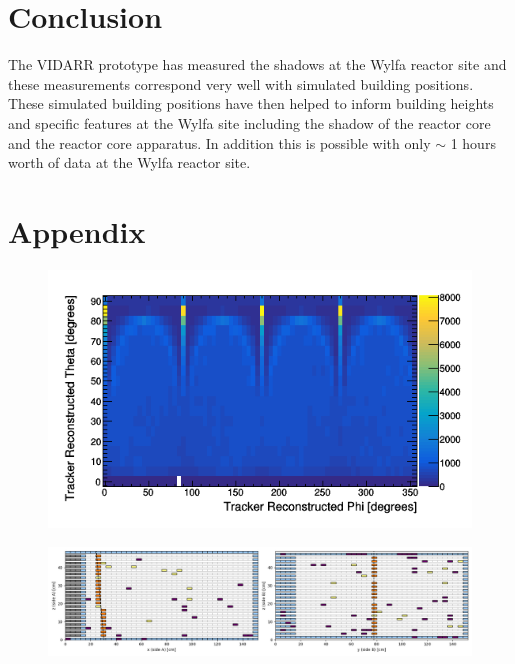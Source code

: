 \documentclass[12pt,a4paper]{article}
\begin{document}
\section{Conclusion} \label{sec:Conclusion}
 The VIDARR prototype has measured the shadows at the Wylfa reactor site and these measurements correspond very well with simulated building positions. These simulated building positions have then helped to inform building heights and specific features at the Wylfa site including the shadow of the reactor core and the reactor core apparatus. In addition this is possible with only $\sim$ 1 hours worth of data at the Wylfa reactor site.


\section{Appendix} \label{sec:appendix}
\begin{figure}[H]
 \centering
 \includegraphics[width=0.7\linewidth]{ReconstructedPhiTheta/pvsTFiduicalHemisphere.png}
 \label{fig:pvstFiducialHem}
\end{figure}

\begin{figure}[H]
 \centering
 \includegraphics[width=1.0\linewidth]{testEventNewScheme.png}
 \label{fig:testEventNewScheme}
\end{figure}
\end{document}
